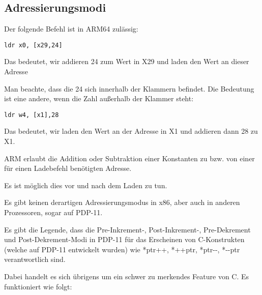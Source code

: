 \subsection{Adressierungsmodi}
\label{ARM_postindex_vs_preindex}
\myindex{\CLanguageElements!\PostIncrement}
\myindex{\CLanguageElements!\PostDecrement}
\myindex{\CLanguageElements!\PreIncrement}
\myindex{\CLanguageElements!\PreDecrement}
Der folgende Befehl ist in ARM64 zulässig:

\begin{lstlisting}[style=customasmARM]
ldr	x0, [x29,24]
\end{lstlisting}
Das bedeutet, wir addieren 24 zum Wert in X29 und laden den Wert an dieser Adresse

Man beachte, dass die 24 sich innerhalb der Klammern befindet. Die Bedeutung ist eine andere, wenn die Zahl außerhalb
der Klammer steht:

\begin{lstlisting}[style=customasmARM]
ldr	w4, [x1],28
\end{lstlisting}

Das bedeutet, wir laden den Wert an der Adresse in X1 und addieren dann 28 zu X1.

ARM erlaubt die Addition oder Subtraktion einer Konstanten zu bzw. von einer für einen Ladebefehl benötigten Adresse.

Es ist möglich dies vor und nach dem Laden zu tun.

Es gibt keinen derartigen Adressierungsmodus in x86, aber auch in anderen Prozessoren, sogar auf PDP-11.

Es gibt die Legende, dass die Pre-Inkrement-, Post-Inkrement-, Pre-Dekrement und Post-Dekrement-Modi in PDP-11 für das
Erscheinen von C-Konstrukten (welche auf PDP-11 entwickelt wurden) wie *ptr++, *++ptr, *ptr-{}-, *-{}-ptr verantwortlich
sind.

Dabei handelt es sich übrigens um ein schwer zu merkendes Feature von C. Es funktioniert wie folgt:


